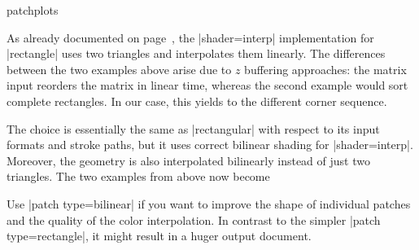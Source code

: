 {\begin{pgfplotslibrary}{patchplots}
\begin{codeexample}[]
\end{codeexample}
%
\noindent As already documented on page~\pageref{key:patch:type}, the
|shader=interp| implementation for |rectangle| uses two triangles and
interpolates them linearly. The differences between the two examples above
arise due to $z$ buffering approaches: the matrix input reorders the matrix in
linear time, whereas the second example would sort complete rectangles. In our
case, this yields to the different corner sequence.

The choice  is essentially the same as |rectangular|
with respect to its input formats and stroke paths, but it uses correct
bilinear shading for |shader=interp|. Moreover, the geometry is also
interpolated bilinearly instead of just two triangles. The two examples from
above now become
%
\begin{codeexample}[]
\end{codeexample}

\begin{codeexample}[]
\end{codeexample}
%
\noindent Use |patch type=bilinear| if you want to improve the shape of
individual patches and the quality of the color interpolation. In contrast to
the simpler |patch type=rectangle|, it might result in a huger output document.


\end{pgfplotslibrary}}
